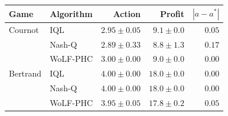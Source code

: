 \begin{tabular}{ll rr r}
\hline
Game & Algorithm & Action & Profit & $|a - a^*|$ \\
\hline
Cournot & IQL & $2.95 \pm 0.05$ & $9.1 \pm 0.0$ & $0.05$ \\
 & Nash-Q & $2.89 \pm 0.33$ & $8.8 \pm 1.3$ & $0.17$ \\
 & WoLF-PHC & $3.00 \pm 0.00$ & $9.0 \pm 0.0$ & $0.00$ \\
\hline
Bertrand & IQL & $4.00 \pm 0.00$ & $18.0 \pm 0.0$ & $0.00$ \\
 & Nash-Q & $4.00 \pm 0.00$ & $18.0 \pm 0.0$ & $0.00$ \\
 & WoLF-PHC & $3.95 \pm 0.05$ & $17.8 \pm 0.2$ & $0.05$ \\
\hline
\end{tabular}